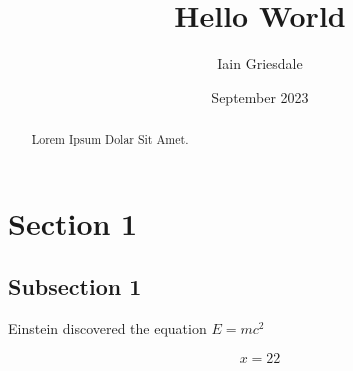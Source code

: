 \documentclass[titlepage]{article}
\title{Hello World}
\author{Iain Griesdale}
\date{September 2023}
\begin{document}
\maketitle

\begin{abstract}
    Lorem Ipsum Dolar Sit Amet.
\end{abstract}

\section{Section 1}

\subsection{Subsection 1}

Einstein discovered the equation $E=mc^2$

\begin{equation}
    x=22
\end{equation}
\end{document}

